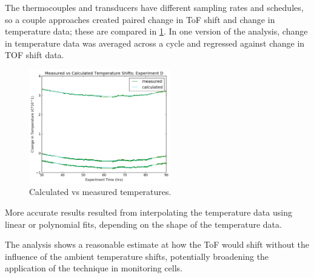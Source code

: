 The thermocouples and transducers have different sampling rates and schedules, so a couple approaches created paired change in ToF shift and change in temperature data; these are compared in \hyperref[fig:0417temp]{\cref{fig:0417temp}}. 
In one version of the analysis, change in temperature data was averaged across a cycle and regressed against change in TOF shift data. 
\begin{figure}[t]\label{fig:0417temp}
    \includegraphics[width=0.55\textwidth]{0417temp.png}
    \centering
    \caption{Calculated vs measured temperatures.}
\end{figure}
More accurate results resulted from interpolating the temperature data using linear or polynomial fits, depending on the shape of the temperature data.

The analysis shows a reasonable estimate at how the ToF would shift without the influence of the ambient temperature shifts, potentially broadening the application of the technique in monitoring cells.

